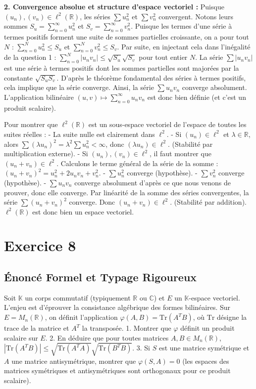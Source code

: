\documentclass[11pt,a4paper]{report}
\begin{document}
\textbf{2. Convergence absolue et structure d'espace vectoriel :}
Puisque $(u_n), (v_n) \in \ell^2(\mathbb{R})$, les séries $\sum u_n^2$ et $\sum v_n^2$ convergent.
Notons leurs sommes $S_u = \sum_{n=0}^\infty u_n^2$ et $S_v = \sum_{n=0}^\infty v_n^2$.
Puisque les termes d'une série à termes positifs forment une suite de sommes partielles croissante, on a pour tout $N$ :
$\sum_{n=0}^N u_n^2 \le S_u$ et $\sum_{n=0}^N v_n^2 \le S_v$.
Par suite, en injectant cela dans l'inégalité de la question 1 :
$\sum_{n=0}^N |u_n v_n| \le \sqrt{S_u} \sqrt{S_v}$ pour tout entier $N$.
La série $\sum |u_n v_n|$ est une série à termes positifs dont les sommes partielles sont majorées par la constante $\sqrt{S_u S_v}$.
D'après le théorème fondamental des séries à termes positifs, cela implique que la série converge.
Ainsi, la série $\sum u_n v_n$ converge absolument. L'application bilinéaire $(u, v) \mapsto \sum_{n=0}^\infty u_n v_n$ est donc bien définie (et c'est un produit scalaire).

Pour montrer que $\ell^2(\mathbb{R})$ est un sous-espace vectoriel de l'espace de toutes les suites réelles :
- La suite nulle est clairement dans $\ell^2$.
- Si $(u_n) \in \ell^2$ et $\lambda \in \mathbb{R}$, alors $\sum (\lambda u_n)^2 = \lambda^2 \sum u_n^2 < \infty$, donc $(\lambda u_n) \in \ell^2$. (Stabilité par multiplication externe).
- Si $(u_n), (v_n) \in \ell^2$, il faut montrer que $(u_n + v_n) \in \ell^2$.
  Calculons le terme général de la série de la somme :
  $(u_n + v_n)^2 = u_n^2 + 2u_nv_n + v_n^2$.
  - $\sum u_n^2$ converge (hypothèse).
  - $\sum v_n^2$ converge (hypothèse).
  - $\sum u_nv_n$ converge absolument d'après ce que nous venons de prouver, donc elle converge.
  Par linéarité de la somme des séries convergentes, la série $\sum (u_n + v_n)^2$ converge.
  Donc $(u_n + v_n) \in \ell^2$. (Stabilité par addition).
$\ell^2(\mathbb{R})$ est donc bien un espace vectoriel.


\section{Exercice 8}


\subsection*{Énoncé Formel et Typage Rigoureux}
Soit $\mathbb{K}$ un corps commutatif (typiquement $\mathbb{R}$ ou $\mathbb{C}$) et $E$ un $\mathbb{K}$-espace vectoriel. L'enjeu est d'éprouver la consistance algébrique des formes bilinéaires.
Sur $E = M_n(\mathbb{R})$, on définit l'application $\varphi(A, B) = \text{Tr}(A^T B)$, où $\text{Tr}$ désigne la trace de la matrice et $A^T$ la transposée.
1. Montrer que $\varphi$ définit un produit scalaire sur $E$.
2. En déduire que pour toutes matrices $A, B \in M_n(\mathbb{R})$, $|\text{Tr}(A^T B)| \le \sqrt{\text{Tr}(A^T A)} \sqrt{\text{Tr}(B^T B)}$.
3. Si $S$ est une matrice symétrique et $A$ une matrice antisymétrique, montrer que $\varphi(S, A) = 0$ (les espaces des matrices symétriques et antisymétriques sont orthogonaux pour ce produit scalaire).
\end{document}
